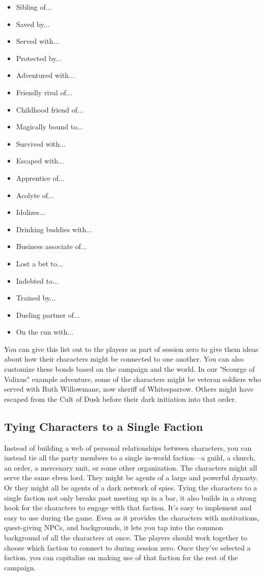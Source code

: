 \documentclass[10pt,a4paper,twoside,bg=print,twocolumn,openany,nodeprecatedcode]{dndbook}
\begin{document}
\begin{itemize}
\item Sibling of...
\item Saved by...
\item Served with...
\item Protected by...
\item Adventured with...
\item Friendly rival of...
\item Childhood friend of...
\item Magically bound to...
\item Survived with...
\item Escaped with...
\item Apprentice of...
\item Acolyte of...
\item Idolizes...
\item Drinking buddies with...
\item Business associate of...
\item Lost a bet to...
\item Indebted to...
\item Trained by...
\item Dueling partner of...
\item On the run with...
\end{itemize}

You can give this list out to the players as part of session zero to give them ideas about how their characters might be connected to one another.
You can also customize these bonds based on the campaign and the world. In our "Scourge of Volixus" example adventure, some of the characters might be veteran soldiers who served with Ruth Willowmane, now sheriff of Whitesparrow. Others might have escaped from the Cult of Dusk before their dark initiation into that order.
\subsection{Tying Characters to a Single Faction}
Instead of building a web of personal relationships between characters, you can instead tie all the party members to a single in-world faction—a guild, a church, an order, a mercenary unit, or some other organization. The characters might all serve the same elven lord. They might be agents of a large and powerful dynasty. Or they might all be agents of a dark network of spies.
Tying the characters to a single faction not only breaks past meeting up in a bar, it also builds in a strong hook for the characters to engage with that faction. It's easy to implement and easy to use during the game. Even as it provides the characters with motivations, quest-giving NPCs, and backgrounds, it lets you tap into the common background of all the characters at once. The players should work together to choose which faction to connect to during session zero. Once they've selected a faction, you can capitalize on making use of that faction for the rest of the campaign.
\end{document}
